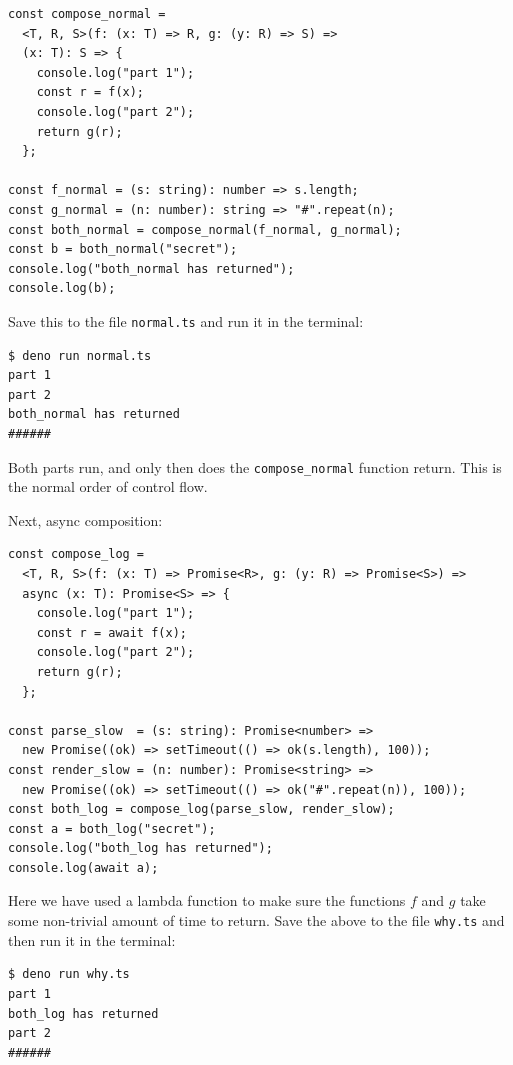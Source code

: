 \documentclass[11pt,a4paper]{article}
\begin{document}
\begin{lstlisting}[language=TS,
  linebackgroundcolor={\ifnum\value{lstnumber}=4\color{hdrbg}\fi
                       \ifnum\value{lstnumber}=6\color{hdrbg}\fi}]
const compose_normal =
  <T, R, S>(f: (x: T) => R, g: (y: R) => S) =>
  (x: T): S => {
    console.log("part 1");
    const r = f(x);
    console.log("part 2");
    return g(r);
  };

const f_normal = (s: string): number => s.length;
const g_normal = (n: number): string => "#".repeat(n);
const both_normal = compose_normal(f_normal, g_normal);
const b = both_normal("secret");
console.log("both_normal has returned");
console.log(b);
\end{lstlisting}

Save this to the file \texttt{normal.ts} and run it in the terminal:

\begin{lstlisting}[language=SH]
$ deno run normal.ts
part 1
part 2
both_normal has returned
######
\end{lstlisting}

Both parts run, and only then does the \texttt{compose\_normal} function return. This is the
normal order of control flow.

\newpage

Next, async composition:

\begin{lstlisting}[language=TS,
  linebackgroundcolor={\ifnum\value{lstnumber}=4\color{hdrbg}\fi
                       \ifnum\value{lstnumber}=6\color{hdrbg}\fi}]
const compose_log =
  <T, R, S>(f: (x: T) => Promise<R>, g: (y: R) => Promise<S>) =>
  async (x: T): Promise<S> => {
    console.log("part 1");
    const r = await f(x);
    console.log("part 2");
    return g(r);
  };

const parse_slow  = (s: string): Promise<number> =>
  new Promise((ok) => setTimeout(() => ok(s.length), 100));
const render_slow = (n: number): Promise<string> =>
  new Promise((ok) => setTimeout(() => ok("#".repeat(n)), 100));
const both_log = compose_log(parse_slow, render_slow);
const a = both_log("secret");
console.log("both_log has returned");
console.log(await a);
\end{lstlisting}

Here we have used a lambda function to make sure the functions $f$ and $g$ take some non-trivial
amount of time to return. Save the above to the file \texttt{why.ts} and then run it in the
terminal:

\begin{lstlisting}[language=SH]
$ deno run why.ts
part 1
both_log has returned
part 2
######
\end{lstlisting}
\end{document}
